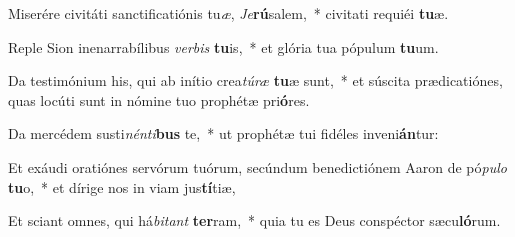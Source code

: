 \item Miserére civitáti sanctificatiónis tu\textit{æ}, \textit{Je}\textbf{rú}salem,~* civitati requiéi \textbf{tu}æ.
\item Reple Sion inenarrabílibus \textit{ver}\textit{bis} \textbf{tu}is,~* et glória tua pópulum \textbf{tu}um.
\item Da testimónium his, qui ab inítio crea\textit{tú}\textit{ræ} \textbf{tu}æ sunt,~* et súscita prædicatiónes, quas locúti sunt in nómine tuo prophétæ pri\textbf{ó}res.
\item Da mercédem susti\textit{nén}\textit{ti}\textbf{bus} te,~* ut prophétæ tui fidéles inveni\textbf{án}tur:
\item Et exáudi oratiónes servórum tuórum, secúndum benedictiónem Aaron de pó\textit{pu}\textit{lo} \textbf{tu}o,~* et dírige nos in viam jus\textbf{tí}tiæ,
\item Et sciant omnes, qui há\textit{bi}\textit{tant} \textbf{ter}ram,~* quia tu es Deus conspéctor sæcu\textbf{ló}rum.
